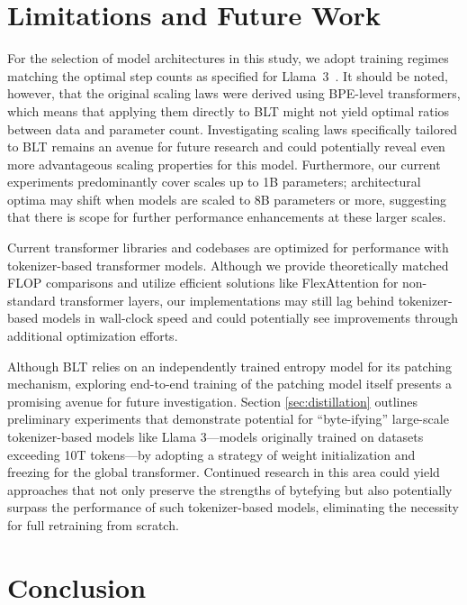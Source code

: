 \section{Limitations and Future Work}

For the selection of model architectures in this study, we adopt training regimes matching the optimal step counts as specified for Llama~3~\citep{dubey2024llama}. It should be noted, however, that the original scaling laws were derived using BPE-level transformers, which means that applying them directly to {\textsc BLT} might not yield optimal ratios between data and parameter count. Investigating scaling laws specifically tailored to {\textsc BLT} remains an avenue for future research and could potentially reveal even more advantageous scaling properties for this model. Furthermore, our current experiments predominantly cover scales up to 1B parameters; architectural optima may shift when models are scaled to 8B parameters or more, suggesting that there is scope for further performance enhancements at these larger scales.

Current transformer libraries and codebases are optimized for performance with tokenizer-based transformer models. Although we provide theoretically matched FLOP comparisons and utilize efficient solutions like FlexAttention for non-standard transformer layers, our implementations may still lag behind tokenizer-based models in wall-clock speed and could potentially see improvements through additional optimization efforts.

Although {\textsc BLT} relies on an independently trained entropy model for its patching mechanism, exploring end-to-end training of the patching model itself presents a promising avenue for future investigation. Section \ref{sec:distillation} outlines preliminary experiments that demonstrate potential for ``byte-ifying'' large-scale tokenizer-based models like Llama 3—models originally trained on datasets exceeding 10T tokens—by adopting a strategy of weight initialization and freezing for the global transformer. Continued research in this area could yield approaches that not only preserve the strengths of bytefying but also potentially surpass the performance of such tokenizer-based models, eliminating the necessity for full retraining from scratch.

\section{Conclusion}
\label{section:conclusion}

